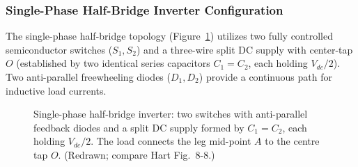 \documentclass[11pt,a4paper]{article}
\newcommand{\swleg}[4]{%
  \draw[thick] (#1,#2+0.75)--(#1,#2+0.35) (#1,#2-0.35)--(#1,#2-0.75);
  \draw[thick,fill=white] (#1-0.3,#2-0.35) rectangle (#1+0.3,#2+0.35);
  \node[font=\footnotesize] at (#1,#2) {#3};
  \draw[thick] (#1,#2+0.55)--(#1+0.75,#2+0.55)--(#1+0.75,#2+0.2) (#1+0.75,#2-0.2)--(#1+0.75,#2-0.55)--(#1,#2-0.55);
  \draw[thick,fill=black] (#1+0.63,#2-0.2)--(#1+0.87,#2-0.2)--(#1+0.75,#2+0.2)--cycle;
  \draw[thick] (#1+0.63,#2+0.2)--(#1+0.87,#2+0.2);
  \node[font=\scriptsize,right] at (#1+0.88,#2) {#4};
}
\newcommand{\capplate}[2]{\fill[white] (#1-0.3,#2-0.14) rectangle (#1+0.3,#2+0.14);\draw[thick] (#1-0.28,#2+0.1)--(#1+0.28,#2+0.1) (#1-0.28,#2-0.1)--(#1+0.28,#2-0.1);}
\newcommand{\zbox}[4]{\draw[thick,fill=white] (#1-#3/2,#2-0.2) rectangle (#1+#3/2,#2+0.2); \node[font=\scriptsize] at (#1,#2) {#4};}
\begin{document}
\subsubsection{Single-Phase Half-Bridge Inverter Configuration}
The single-phase half-bridge topology (Figure~\ref{fig:half_bridge}) utilizes two fully controlled semiconductor switches ($S_1, S_2$) and a three-wire split DC supply with center-tap $O$ (established by two identical series capacitors $C_1 = C_2$, each holding $V_{dc}/2$). Two anti-parallel freewheeling diodes ($D_1, D_2$) provide a continuous path for inductive load currents.

\begin{figure}[htbp]
\centering
{}
\caption{Single-phase half-bridge inverter: two switches with anti-parallel feedback diodes and a split DC supply formed by $C_1=C_2$, each holding $V_{dc}/2$. The load connects the leg mid-point $A$ to the centre tap $O$. (Redrawn; compare Hart Fig.~8-8.)}
\label{fig:half_bridge}
\end{figure}
\end{document}
